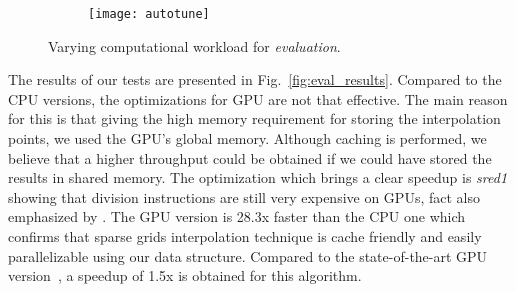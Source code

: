 \begin{figure}[t]
  \begin{subfigure}[b]{1\linewidth}
    \centering
    \texttt{[image: autotune]}
  \end{subfigure}
  \caption{Varying computational workload for \textit{evaluation}.}
  \label{fig:autotune}
\end{figure}


The results of our tests are presented in Fig.~\ref{fig:eval_results}. Compared
to the CPU versions, the optimizations for GPU are not that effective. The main
reason for this is that giving the high memory requirement for storing the
interpolation points, we used the GPU's global memory. Although caching is
performed, we believe that a higher throughput could be obtained if we could
have stored the results in shared memory. The optimization which brings a clear
speedup is \textit{sred1} showing that division instructions are still very
expensive on GPUs, fact also emphasized by \cite{cuda}. The GPU version is 28.3x
faster than the CPU one which confirms that sparse grids interpolation technique
is cache friendly and easily parallelizable using our data structure. Compared
to the state-of-the-art GPU version~\cite{Murarasu:2011:CDS:1941553.1941559}, a
speedup of 1.5x is obtained for this algorithm.

